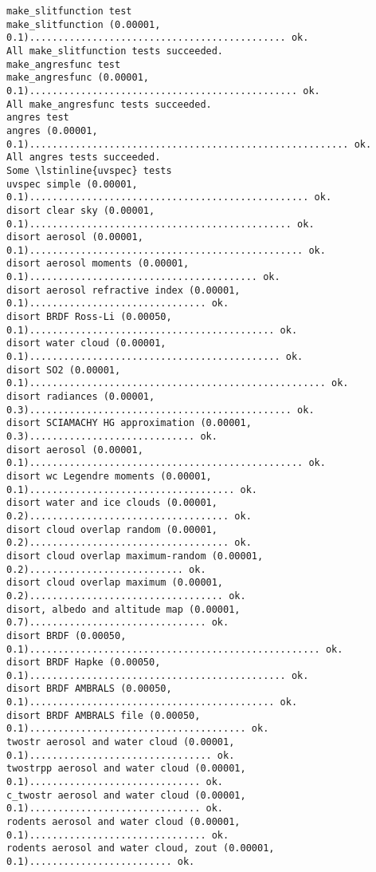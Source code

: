 \begin{enumerate}
\begin{lstlisting}[style=tinysize]
make_slitfunction test
make_slitfunction (0.00001,   0.1)............................................. ok.
All make_slitfunction tests succeeded.
make_angresfunc test
make_angresfunc (0.00001,   0.1)............................................... ok.
All make_angresfunc tests succeeded.
angres test
angres (0.00001,   0.1)........................................................ ok.
All angres tests succeeded.
Some \lstinline{uvspec} tests
uvspec simple (0.00001,   0.1)................................................. ok.
disort clear sky (0.00001,   0.1).............................................. ok.
disort aerosol (0.00001,   0.1)................................................ ok.
disort aerosol moments (0.00001,   0.1)........................................ ok.
disort aerosol refractive index (0.00001,   0.1)............................... ok.
disort BRDF Ross-Li (0.00050,   0.1)........................................... ok.
disort water cloud (0.00001,   0.1)............................................ ok.
disort SO2 (0.00001,   0.1).................................................... ok.
disort radiances (0.00001,   0.3).............................................. ok.
disort SCIAMACHY HG approximation (0.00001,   0.3)............................. ok.
disort aerosol (0.00001,   0.1)................................................ ok.
disort wc Legendre moments (0.00001,   0.1).................................... ok.
disort water and ice clouds (0.00001,   0.2)................................... ok.
disort cloud overlap random (0.00001,   0.2)................................... ok.
disort cloud overlap maximum-random (0.00001,   0.2)........................... ok.
disort cloud overlap maximum (0.00001,   0.2).................................. ok.
disort, albedo and altitude map (0.00001,   0.7)............................... ok.
disort BRDF (0.00050,   0.1)................................................... ok.
disort BRDF Hapke (0.00050,   0.1)............................................. ok.
disort BRDF AMBRALS (0.00050,   0.1)........................................... ok.
disort BRDF AMBRALS file (0.00050,   0.1)...................................... ok.
twostr aerosol and water cloud (0.00001,   0.1)................................ ok.
twostrpp aerosol and water cloud (0.00001,   0.1).............................. ok.
c_twostr aerosol and water cloud (0.00001,   0.1).............................. ok.
rodents aerosol and water cloud (0.00001,   0.1)............................... ok.
rodents aerosol and water cloud, zout (0.00001,   0.1)......................... ok.

\end{lstlisting}
\end{enumerate}
